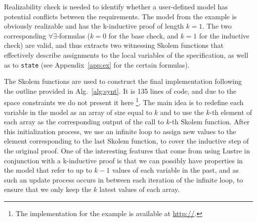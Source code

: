 
Realizability check is needed to identify whether a user-defined model
 has potential conflicts between the requirements.
The model from the example is obviously realizable and has
the k-inductive proof of length $k = 1$.
The two corresponding $\forall\exists$-formulas ($k=0$ for
the base check, and $k=1$ for the inductive check) are valid, and thus  \aeval
extracts two witnessing Skolem functions
that effectively describe
 assignments to the local variables of the specification, as well as to \texttt{state}
(see Appendix~\ref{app:ex} for the certain formulas).

The Skolem functions are used to construct the final implementation
following the outline provided in Alg.~\ref{alg:synt}. 
It is 135 lines of code, and due to the space constraints we do not
present it here%
\footnote{The implementation for the
example is available at \url{http://}.}.
The main idea is to redefine each variable in the model 
as an array of size equal to $k$ and
to use the $k$-th element of each array as the corresponding output of the call
to $k$-th Skolem function. After this initialization process, we use an infinite
loop to assign new values to the element corresponding to the last Skolem
function, to cover the inductive step of the original proof. 
One of the
interesting features that come from using Lustre in conjunction with a
k-inductive proof is that we can possibly have properties in the model that
refer to up to $k-1$ values of each variable in the past, and as such an update
process occurs in between each iteration of the infinite loop, to ensure that we
only keep the $k$ latest values of each array.
